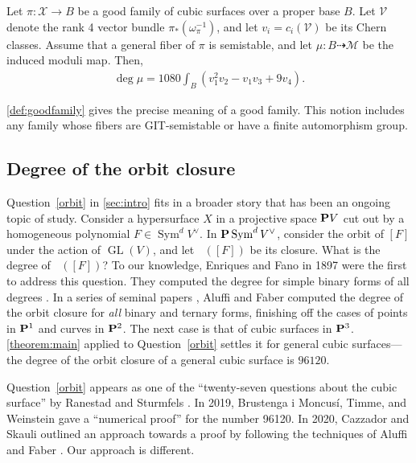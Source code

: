 \documentclass[reqno]{amsart}
\DeclareMathOperator{\Orb}{\overline{Orb}}
\renewcommand{\to}{{\longrightarrow}}
\renewcommand {\P}{{\bf P}}
\providecommand{\GL}{\operatorname{GL}}
\providecommand{\Sym}{\operatorname{Sym}}
\numberwithin{equation}{section}
\newcommand{\V}{\mathcal{V}}
\newcommand{\cX}{\mathcal{X}}
\begin{document}
\begin{theorem}\label{theorem:main}
  Let $\pi \colon \cX \to B$ be a good family of cubic surfaces over a
  proper base $B$.
  Let $\V$ denote the rank 4 vector bundle
  $ \pi_* \left(\omega_{\pi}^{-1}\right)$, and let
  \(v_i = c_i\left(\V\right)\) be its Chern classes.  Assume that a
  general fiber of $\pi$ is semistable, and let
  $\mu \colon B \dashrightarrow \mathcal{M}$ be the induced moduli map.  Then,
  \begin{align}
    \deg \mu =
    \label{eq:MAIN}
    1080 \int_{B} \left(v_{1}^{2}v_{2} - v_{1}v_{3}+ 9v_{4}\right).
  \end{align}
\end{theorem}
\autoref{def:goodfamily} gives the precise meaning of a good family.  This notion includes any family whose fibers are
GIT-semistable or have a finite automorphism group.

\subsection{Degree of the orbit closure}
Question~\ref{orbit} in \autoref{sec:intro} fits in a broader story
that has been an ongoing topic of study.  Consider a hypersurface
\(X\) in a projective space $\P V$ cut out by a homogeneous polynomial
$F \in \Sym^d V^{\vee}$.  In $\P\Sym^dV^{\vee}$, consider the orbit of
$[F]$ under the action of $\GL(V)$, and let $\Orb([F])$ be its
closure.  What is the degree of $\Orb([F])$?  To our knowledge,
Enriques and Fano in 1897 were the first to address this question.
They computed the degree for simple binary forms of all degrees
\cite{enr.fan:97}.  In a series of seminal papers \cite{Aluffi1993,
  alu.fab:93, alu.fab:00}, Aluffi and Faber computed the degree of the
orbit closure for \emph{all} binary and ternary forms, finishing off
the cases of points in $\P^1$ and curves in $\P^2$.  The next case is
that of cubic surfaces in $\P^3$.  \autoref{theorem:main} applied to
Question~\ref{orbit} settles it for general cubic surfaces---the
degree of the orbit closure of a general cubic surface is $96120$.

Question~\ref{orbit} appears as one of the ``twenty-seven questions
about the cubic surface'' by Ranestad and Sturmfels \cite{ran.stu:20}.
In 2019, Brustenga i Moncus\'i, Timme, and Weinstein gave a
``numerical proof'' for the number 96120. In 2020, Cazzador and
Skauli outlined an approach towards a proof by following the
techniques of Aluffi and Faber \cite{bru-i-mon.tim.wei:20,caz.ska:20}.
Our approach is different.
\end{document}
